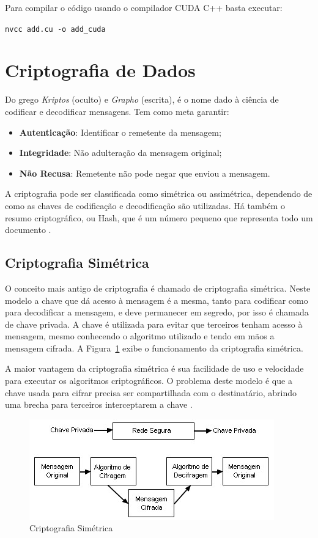 Para compilar o código usando o compilador CUDA C++ basta executar:
\begin{center}
\texttt{nvcc add.cu -o add\_cuda}
\end{center}

\section{Criptografia de Dados}

Do grego \textit{Kriptos} (oculto) e \textit{Grapho} (escrita), é o nome dado à ciência de codificar e decodificar mensagens. Tem como meta garantir:
\begin{itemize}
    \item \textbf{Autenticação}: Identificar o remetente da mensagem;
    \item \textbf{Integridade}: Não adulteração da mensagem original;
    \item \textbf{Não Recusa}: Remetente não pode negar que enviou a mensagem.
\end{itemize}

A criptografia pode ser classificada como simétrica ou assimétrica, dependendo de como as chaves de codificação e decodificação são utilizadas. Há também o resumo criptográfico, ou Hash, que é um número pequeno que representa todo um documento \cite{Stallings2014}.

\subsection{Criptografia Simétrica}

O conceito mais antigo de criptografia é chamado de criptografia simétrica. Neste modelo a chave que dá acesso à mensagem é a mesma, tanto para codificar como para decodificar a mensagem, e deve permanecer em segredo, por isso é chamada de chave privada. A chave é utilizada para evitar que terceiros tenham acesso à mensagem, mesmo conhecendo o algoritmo utilizado e tendo em mãos a mensagem cifrada. A Figura~\ref{fig:cripsim} exibe o funcionamento da criptografia simétrica.

A maior vantagem da criptografia simétrica é sua facilidade de uso e velocidade para executar os algoritmos criptográficos. O problema deste modelo é que a chave usada para cifrar precisa ser compartilhada com o destinatário, abrindo uma brecha para terceiros interceptarem a chave \cite{Stallings2014}.

\begin{figure}[t]
    \centering
    \includegraphics{Images/Simetrica.jpg}
    \caption{Criptografia Simétrica}\label{fig:cripsim}
\end{figure}


